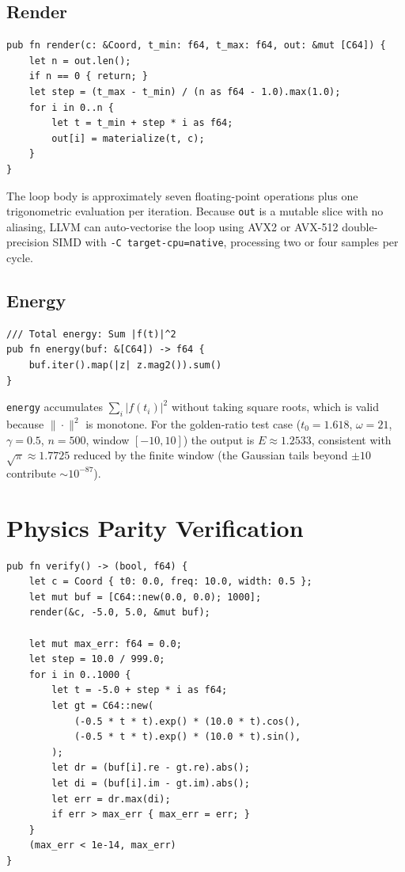 \documentclass[11pt,a4paper]{article}
\theoremstyle{definition}
\newcommand{\CB}[1]{\texttt{#1}}
\begin{document}
\subsection{Render}

\begin{lstlisting}[caption={render: fills a buffer at linearly-spaced sample points},label={lst:render}]
pub fn render(c: &Coord, t_min: f64, t_max: f64, out: &mut [C64]) {
    let n = out.len();
    if n == 0 { return; }
    let step = (t_max - t_min) / (n as f64 - 1.0).max(1.0);
    for i in 0..n {
        let t = t_min + step * i as f64;
        out[i] = materialize(t, c);
    }
}
\end{lstlisting}

The loop body is approximately seven floating-point operations plus one
trigonometric evaluation per iteration.  Because \CB{out} is a mutable
slice with no aliasing, LLVM can auto-vectorise the loop using AVX2
or AVX-512 double-precision SIMD with
\texttt{-C target-cpu=native}, processing two or four samples per cycle.

\subsection{Energy}

\begin{lstlisting}[caption={energy: sum of squared moduli (no sqrt)},label={lst:energy}]
/// Total energy: Sum |f(t)|^2
pub fn energy(buf: &[C64]) -> f64 {
    buf.iter().map(|z| z.mag2()).sum()
}
\end{lstlisting}

\CB{energy} accumulates $\sum_i |f(t_i)|^2$ without taking square roots,
which is valid because $\|\cdot\|^2$ is monotone.  For the golden-ratio
test case ($t_0 = 1.618$, $\omega = 21$, $\gamma = 0.5$, $n = 500$,
window $[-10,10]$) the output is $E \approx 1.2533$, consistent with
$\sqrt{\pi} \approx 1.7725$ reduced by the finite window (the Gaussian
tails beyond $\pm 10$ contribute $\sim 10^{-87}$).

\section{Physics Parity Verification}
\label{sec:verify}

\begin{lstlisting}[caption={verify: physics parity check against analytical ground truth},label={lst:verify}]
pub fn verify() -> (bool, f64) {
    let c = Coord { t0: 0.0, freq: 10.0, width: 0.5 };
    let mut buf = [C64::new(0.0, 0.0); 1000];
    render(&c, -5.0, 5.0, &mut buf);

    let mut max_err: f64 = 0.0;
    let step = 10.0 / 999.0;
    for i in 0..1000 {
        let t = -5.0 + step * i as f64;
        let gt = C64::new(
            (-0.5 * t * t).exp() * (10.0 * t).cos(),
            (-0.5 * t * t).exp() * (10.0 * t).sin(),
        );
        let dr = (buf[i].re - gt.re).abs();
        let di = (buf[i].im - gt.im).abs();
        let err = dr.max(di);
        if err > max_err { max_err = err; }
    }
    (max_err < 1e-14, max_err)
}
\end{lstlisting}
\end{document}
